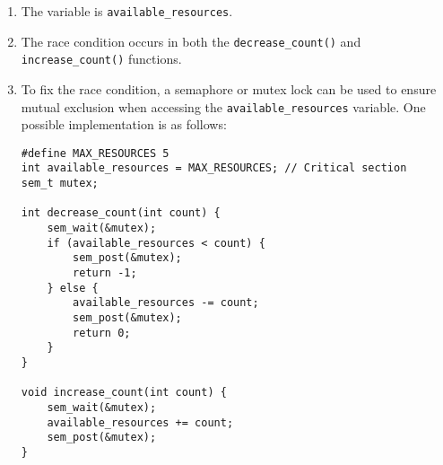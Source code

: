 \documentclass{article}
\def\c#1{\texttt{#1}}
\begin{document}
\begin{enumerate}
	\item The variable is \c{available\_resources}.

	\item The race condition occurs in both the \c{decrease\_count()} and \c{increase\_count()} functions.

	\item To fix the race condition, a semaphore or mutex lock can be used to ensure mutual exclusion when accessing the \c{available\_resources} variable. One possible implementation is as follows:

	      \begin{lstlisting}[style=cstyle]
#define MAX_RESOURCES 5
int available_resources = MAX_RESOURCES; // Critical section
sem_t mutex;

int decrease_count(int count) {
    sem_wait(&mutex);
    if (available_resources < count) {
        sem_post(&mutex);
        return -1;
    } else {
        available_resources -= count;
        sem_post(&mutex);
        return 0;
    }
}

void increase_count(int count) {
    sem_wait(&mutex);
    available_resources += count;
    sem_post(&mutex);
}
\end{lstlisting}
\end{enumerate}

\pagebreak
\end{document}
